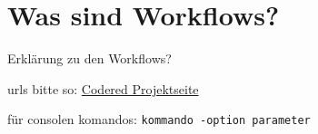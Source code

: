 \chapter{Was sind Workflows?}  %
\label{chapter:Was sind Workflows?}  %

Erklärung zu den Workflows?

urls bitte so:
\href{http://codered.berlios.de}{Codered Projektseite}


für consolen komandos:
\verb|kommando -option parameter|
